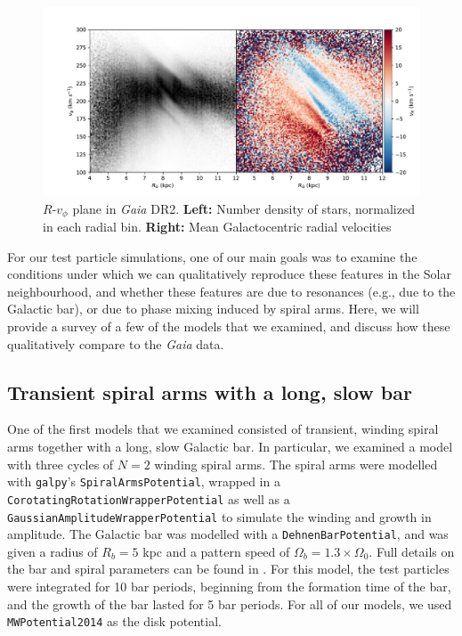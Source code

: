 \documentclass[10pt]{article}
\begin{document}
\begin{figure}[h]
    \centering
    \includegraphics[width=\textwidth]{plots/gaia_RvT.pdf}
    \caption{$R$-$v_\phi$ plane in \textit{Gaia} DR2. \textbf{Left:} Number density of stars, normalized in each radial bin. \textbf{Right:} Mean Galactocentric radial velocities}
    \label{fig:gaia}
\end{figure}

For our test particle simulations, one of our main goals was to examine the conditions under which we can qualitatively reproduce these features in the Solar neighbourhood, and whether these features are due to resonances (e.g., due to the Galactic bar), or due to phase mixing induced by spiral arms. Here, we will provide a survey of a few of the models that we examined, and discuss how these qualitatively compare to the \textit{Gaia} data.

\subsection{Transient spiral arms with a long, slow bar}
One of the first models that we examined consisted of transient, winding spiral arms together with a long, slow Galactic bar. In particular, we examined a model with three cycles of $N=2$ winding spiral arms. The spiral arms were modelled with \texttt{galpy}'s \texttt{SpiralArmsPotential}, wrapped in a \texttt{CorotatingRotationWrapperPotential} as well as a \texttt{GaussianAmplitudeWrapperPotential} to simulate the winding and growth in amplitude. The Galactic bar was modelled with a \texttt{DehnenBarPotential}, and was given a radius of $R_b = 5$ kpc and a pattern speed of $\Omega_b = 1.3 \times \Omega_0$. Full details on the bar and spiral parameters can be found in \textcite{hunt2019}. For this model, the test particles were integrated for 10 bar periods, beginning from the formation time of the bar, and the growth of the bar lasted for 5 bar periods. For all of our models, we used \texttt{MWPotential2014} as the disk potential.
\end{document}
